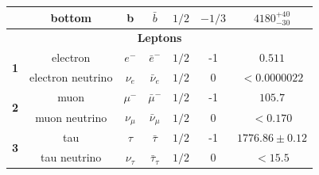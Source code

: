 \begin{table}[h!]
\begin{tabular}{|ccccccc|}
    \multicolumn{1}{|c|}{}                            & \multicolumn{1}{c|}{bottom}            & \multicolumn{1}{c|}{b}               & \multicolumn{1}{c|}{$\bar{b}$}             & \multicolumn{1}{c|}{$1/2$} & \multicolumn{1}{c|}{$-1/3$}  & $4180_{-30}^{+40}$                             \\ \hline
    \multicolumn{7}{|c|}{\textbf{Leptons}}                                                                                                                                                                                                                                                                               \\ \hline
    \multicolumn{1}{|c|}{\multirow{2}{*}{\textbf{1}}}                & \multicolumn{1}{c|}{electron}          & \multicolumn{1}{c|}{$e^-$}           & \multicolumn{1}{c|}{$\bar{e}^-$}           & \multicolumn{1}{c|}{$1/2$} & \multicolumn{1}{c|}{-1}              & $0.511$                                        \\ \cline{2-7} 
    \multicolumn{1}{|c|}{}                   & \multicolumn{1}{c|}{electron neutrino} & \multicolumn{1}{c|}{$\nu_{e}$}       & \multicolumn{1}{c|}{$\bar{\nu}_e$}         & \multicolumn{1}{c|}{$1/2$} & \multicolumn{1}{c|}{0}               & $<0.0000022$                                   \\ \hline
    \multicolumn{1}{|c|}{\multirow{2}{*}{\textbf{2}}} & \multicolumn{1}{c|}{muon}              & \multicolumn{1}{c|}{$\mu^-$}         & \multicolumn{1}{c|}{$\bar{\mu}^-$}         & \multicolumn{1}{c|}{$1/2$} & \multicolumn{1}{c|}{-1}              & $105.7$                                        \\ \cline{2-7} 
    \multicolumn{1}{|c|}{}                            & \multicolumn{1}{c|}{muon neutrino}     & \multicolumn{1}{c|}{$\nu_{\mu}$}     & \multicolumn{1}{c|}{$\bar{\nu}_{\mu}$}     & \multicolumn{1}{c|}{$1/2$} & \multicolumn{1}{c|}{0}               & $<0.170$                                       \\ \hline
    \multicolumn{1}{|c|}{\multirow{2}{*}{\textbf{3}}} & \multicolumn{1}{c|}{tau}               & \multicolumn{1}{c|}{$\tau$}          & \multicolumn{1}{c|}{$\bar{\tau}$}          & \multicolumn{1}{c|}{$1/2$} & \multicolumn{1}{c|}{-1}              & $1776.86 \pm 0.12$                             \\ \cline{2-7} 
    \multicolumn{1}{|c|}{}                            & \multicolumn{1}{c|}{tau neutrino}      & \multicolumn{1}{c|}{$\nu_{\tau}$}    & \multicolumn{1}{c|}{$\bar{\tau}_{\tau}$}   & \multicolumn{1}{c|}{$1/2$} & \multicolumn{1}{c|}{0}               & $< 15.5$                                       \\ \hline
    \end{tabular}
    \end{table}
